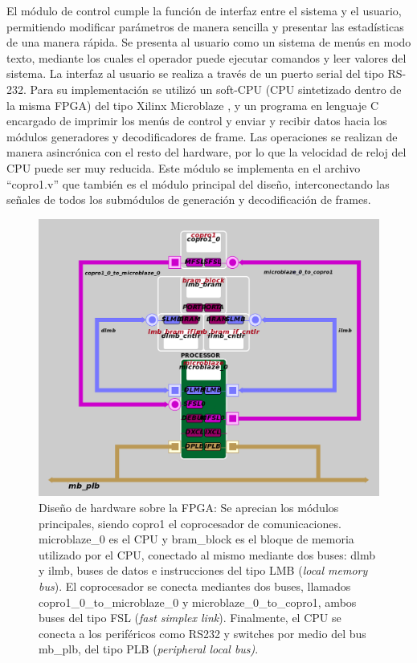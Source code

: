 El módulo de control cumple la función de interfaz entre el sistema y el usuario, permitiendo modificar parámetros de manera sencilla y presentar las estadísticas de una manera rápida. Se presenta al usuario como un sistema de menús en modo texto, mediante los cuales el operador puede ejecutar comandos y leer valores del sistema. La interfaz al usuario se realiza a través de un puerto serial del tipo RS-232. Para su implementación se utilizó un soft-CPU (CPU sintetizado dentro de la misma FPGA) del tipo Xilinx Microblaze \cite{Xilinx:DS865}, y un programa en lenguaje C encargado de imprimir los menús de control y enviar y recibir datos hacia los módulos generadores y decodificadores de frame. Las operaciones se realizan de manera asincrónica con el resto del hardware, por lo que la velocidad de reloj del CPU puede ser muy reducida. Este módulo se implementa en el archivo ``copro1.v'' que también es el módulo principal del diseño, interconectando las señales de todos los submódulos de generación y decodificación de frames.


\begin{figure}[t]
  \centering
    \includegraphics[width=5.25in]{graphs/diagramaXilinx.png}
\caption {Diseño de hardware sobre la FPGA: Se aprecian los módulos principales, siendo copro1 el coprocesador de comunicaciones. microblaze\_0 es el CPU y bram\_block es el bloque de memoria utilizado por el CPU, conectado al mismo mediante dos buses: dlmb y ilmb, buses de datos e instrucciones del tipo LMB (\textit{local memory bus}). El coprocesador se conecta mediantes dos buses, llamados copro1\_0\_to\_microblaze\_0 y microblaze\_0\_to\_copro1, ambos buses del tipo FSL (\textit{fast simplex link}). Finalmente, el CPU se conecta a los periféricos como RS232 y switches por medio del bus mb\_plb, del tipo PLB (\textit{peripheral local bus)}.}
\label{fig:fpgahard}
\end{figure}

